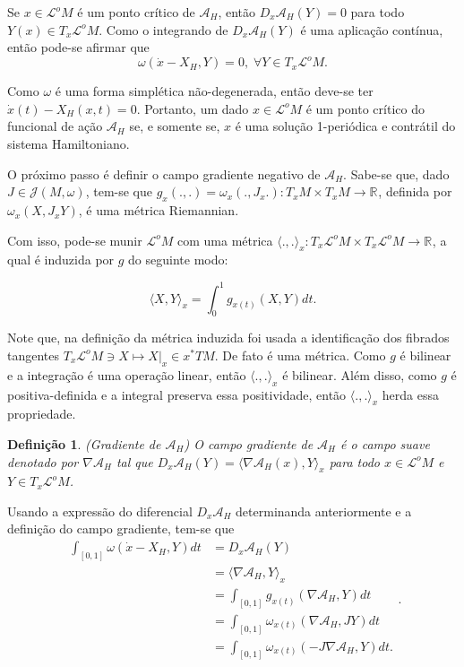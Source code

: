 \documentclass[12pt]{book}
\newtheorem{definicao}[teorema]{Definição}
\newcommand{\campohamiltonianoabrev}{X_{H}}
\newcommand{\espacotangenteponto}[2]{T_{#1}#2}
\newcommand{\estruturascomplexas}[2]{\mathcal{J}(#1, #2)}
\newcommand{\funcionalH}{\mathcal{A}_{H}}
\newcommand{\gradientefuncional}{\nabla \funcionalH}
\newcommand{\iprod}[2]{\langle #1, #2 \rangle}
\newcommand{\produtointerno}[2]{\langle #1, #2 \rangle}
\newcommand{\pullbackfibradotangente}[2]{#1^{*}T#2}
\newcommand{\real}[1]{\mathbb{R}^{#1}}
\newcommand{\reta}{\real{}}
\newcommand{\lacocontrateis}{\mathcal{L}^{o}M}
\begin{document}
	Se $x \in \lacocontrateis$ é um ponto crítico de $\funcionalH$, então $D_{x}\funcionalH(Y) = 0 $ para todo $Y(x) \in \espacotangenteponto{x}{\lacocontrateis}$. Como o integrando de $D_{x}\funcionalH(Y)$ é uma aplicação contínua, então pode-se afirmar que
	$$
	\omega(\dot{x} - \campohamiltonianoabrev, Y)=0,\; \forall Y \in \espacotangenteponto{x}{\lacocontrateis}.
	$$
	
	Como $\omega$  é uma forma simplética não-degenerada, então deve-se ter $\dot{x}(t) - \campohamiltonianoabrev(x, t)=0$. Portanto, um dado $x \in \lacocontrateis$ é um ponto crítico do funcional de ação $\funcionalH$ se, e somente se, $x$ é uma solução 1-periódica e contrátil do sistema Hamiltoniano.
	
	O próximo passo é definir o campo gradiente negativo de $\funcionalH$. Sabe-se que, dado $J \in \estruturascomplexas{M}{\omega}$, tem-se que $g_{x}(., .)=\omega_{x}(.,J_{x}.):T_{x}M\times T_{x}M \to \reta$, definida por $\omega_{x}(X,J_{x}Y)$, é uma métrica Riemannian.
	
	Com isso, pode-se munir $\lacocontrateis$ com uma métrica $\produtointerno{.}{.}_{x}: \espacotangenteponto{x}{\lacocontrateis} \times \espacotangenteponto{x}{\lacocontrateis} \to \reta$, a qual é induzida por $g$ do seguinte modo:
	
	$$
	\produtointerno{X}{Y}_{x} = \int_{0}^{1}g_{x(t)}(X, Y)dt.
	$$
	
	Note que, na definição da métrica induzida foi usada a identificação dos fibrados tangentes $\espacotangenteponto{x}{\lacocontrateis} \ni X \mapsto  X|_{x} \in \pullbackfibradotangente{x}{M}$. De fato é uma métrica. Como $g$ é bilinear e a integração é uma operação linear, então $\produtointerno{.}{.}_{x}$ é bilinear. Além disso, como $g$ é positiva-definida e a integral preserva essa positividade, então $\produtointerno{.}{.}_{x}$ herda essa propriedade.
	
	\begin{definicao}
		(Gradiente de $\funcionalH$) O campo gradiente de $\funcionalH$ é o campo suave denotado por $\gradientefuncional$ tal que $D_{x}\funcionalH(Y) = \produtointerno{\gradientefuncional(x)}{Y}_{x}$ para todo $x \in \lacocontrateis$ e $Y \in \espacotangenteponto{x}{\lacocontrateis}$.
	\end{definicao}
	
	Usando a expressão do diferencial $D_{x}\funcionalH$ determinanda anteriormente e a definição do campo gradiente, tem-se que
	$$
	\begin{aligned}
	\int_{[0,1]} \omega(\dot{x} - \campohamiltonianoabrev, Y)dt&=
	D_{x}\funcionalH(Y)
	\\ 
	&= \iprod{\gradientefuncional}{Y}_{x}
	\\
	&= \int_{[0,1]}g_{x(t)}(\gradientefuncional, Y)dt
	\\
	&=\int_{[0,1]} \omega_{x(t)}(\gradientefuncional, JY)dt
	\\
	&=\int_{[0,1]} \omega_{x(t)}(-J\gradientefuncional, Y)dt.
	\end{aligned}.
	$$
	
\end{document}
